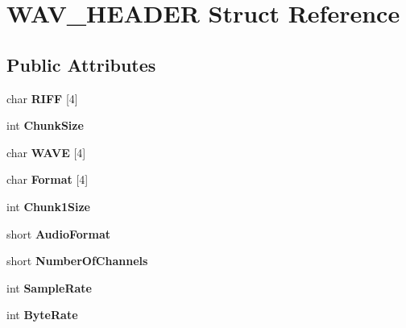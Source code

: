 \hypertarget{structWAV__HEADER}{}\section{W\+A\+V\+\_\+\+H\+E\+A\+D\+ER Struct Reference}
\label{structWAV__HEADER}
\subsection*{Public Attributes}
\begin{DoxyCompactItemize}
\item 
\mbox{\label{structWAV__HEADER_a8406498dfbcaaff8823f926554b0b5ae}} 
char {\bfseries R\+I\+FF} \mbox{[}4\mbox{]}
\item 
\mbox{\label{structWAV__HEADER_aec71b96ceea4b1767543db830999b716}} 
int {\bfseries Chunk\+Size}
\item 
\mbox{\label{structWAV__HEADER_a52a80583ba9282a799dc60888d4cee92}} 
char {\bfseries W\+A\+VE} \mbox{[}4\mbox{]}
\item 
\mbox{\label{structWAV__HEADER_a4720b4ea78fe5c0ce5bfc29cc90d4c86}} 
char {\bfseries Format} \mbox{[}4\mbox{]}
\item 
\mbox{\label{structWAV__HEADER_a35e7322433e76c8e53ad7f12205db141}} 
int {\bfseries Chunk1\+Size}
\item 
\mbox{\label{structWAV__HEADER_a694117914b2333a5b07e667ad0dae617}} 
short {\bfseries Audio\+Format}
\item 
\mbox{\label{structWAV__HEADER_a6bf86bc189b27c2c9ac4541792fc9aee}} 
short {\bfseries Number\+Of\+Channels}
\item 
\mbox{\label{structWAV__HEADER_a055f847201c7104f1f366d5d32d7d1de}} 
int {\bfseries Sample\+Rate}
\item 
\mbox{\label{structWAV__HEADER_afde112165ca94b23cc4e614eab2ce9d1}} 
int {\bfseries Byte\+Rate}
\item 
\mbox{\label{structWAV__HEADER_aa3ef0f6569986a915ddc0f71adc29746}} 

\end{DoxyCompactItemize}
